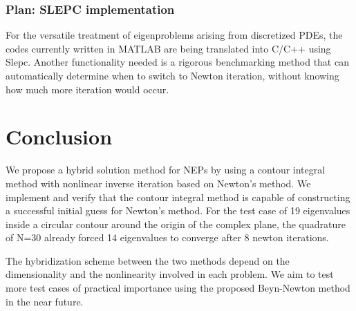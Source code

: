 \documentclass[final,leqno,onefignum,onetabnum]{siamltex1213}
\begin{document}
\subsubsection{Plan: SLEPC implementation}
For the versatile treatment of eigenproblems arising from discretized PDEs, the codes currently written in MATLAB are being translated into C/C++ using Slepc. Another functionality needed is a rigorous benchmarking method that can automatically determine when to switch to Newton iteration, without knowing how much more iteration would occur. 

\section{Conclusion} 
We propose a hybrid solution method for NEPs by using a contour integral method with nonlinear inverse iteration based on Newton's method. We implement and verify that the contour integral method is capable of constructing a successful initial guess for Newton's method. For the test case of 19 eigenvalues inside a circular contour around the origin of the complex plane, the quadrature of N=30 already forced 14 eigenvalues to converge after 8 newton iterations.

The hybridization scheme between the two methods depend on the dimensionality and the nonlinearity involved in each problem. We aim to test more test cases of practical importance using the proposed Beyn-Newton method in the near future. 

\clearpage

%

\end{document}
